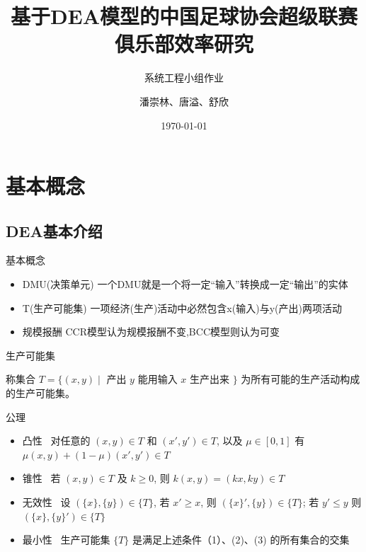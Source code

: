 \documentclass[]{beamer}
\author{潘崇林、唐溢、舒欣}
\title{基于DEA模型的中国足球协会超级联赛俱乐部效率研究}
\subtitle{系统工程小组作业}
\institute{商学院}
\date{\today}
\begin{document}
\kaishu
\begin{frame}
    \titlepage
\end{frame}


\begin{frame}
    \tableofcontents[sectionstyle=show,subsectionstyle=show/shaded/hide,subsubsectionstyle=show/shaded/hide]
\end{frame}

\section{基本概念}

\subsection{DEA基本介绍}

\begin{frame}{基本概念}
    \begin{itemize}
        \item DMU(决策单元) 一个DMU就是一个将一定“输入”转换成一定“输出”的实体 
        \item T(生产可能集) 一项经济(生产)活动中必然包含x(输入)与y(产出)两项活动
        \item 规模报酬 CCR模型认为规模报酬不变,BCC模型则认为可变
    \end{itemize}
\end{frame}

\begin{frame}{生产可能集}
    \kaishu
    \begin{define}[生产可能]
        称集合 $T=\{(x, y) \mid$ 产出 $y$ 能用输入 $x$ 生产出来 $\}$ 为所有可能的生产活动构成的生产可能集。
    \end{define}
    \begin{block}{公理}
        \begin{itemize}
            \item 凸性 \ 对任意的 $(x, y) \in T$ 和 $(x', y') \in T$, 以及 $\mu \in [0,1]$ 有 $\mu(x, y)+(1-\mu)(x', y') \in T$
            \item 锥性 \ 若 $(x, y) \in T$ 及 $k \geq 0$, 则 $k(x, y)=(kx, ky) \in T$
            \item 无效性 \ 设 $(\{x\}, \{y\}) \in \{T\}$, 若 $x' \geq x$, 则 $(\{x\}', \{y\}) \in \{T\}$; 若 $y' \leq y$ 则 $(\{x\}, \{y\}') \in \{T\}$
            \item 最小性 \ 生产可能集 $\{T\}$ 是满足上述条件（1）、(2)、(3) 的所有集合的交集
        \end{itemize}
    \end{block}	
    \end{frame}
\end{document}
